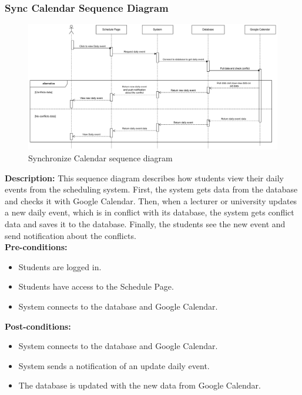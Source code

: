 \subsubsection{Sync Calendar Sequence Diagram}
    \begin{figure}[H]
        \centering
        \includegraphics[width=1\textwidth]{image/SyncCalendar.pdf} 
        \caption{Synchronize Calendar sequence diagram}
        \label{fig:sync_calendar_sequence}
    \end{figure}

    \textbf{Description:} This sequence diagram describes how students view their daily events from the scheduling system. 
    First, the system gets data from the database and checks it with Google Calendar. Then, when a lecturer or university updates a new daily event, which is in conflict with its database, the system gets conflict data and saves it to the database. 
    Finally, the students see the new event and send notification about the conflicts. \\

    \noindent \textbf{Pre-conditions:} 
        \begin{itemize}
            \item Students are logged in.
            \item Students have access to the Schedule Page.
            \item System connects to the database and Google Calendar.
        \end{itemize}

    \noindent \textbf{Post-conditions:}
    \begin{itemize}
        \item System connects to the database and Google Calendar.
        \item System sends a notification of an update daily event.
        \item The database is updated with the new data from Google Calendar.
    \end{itemize}

